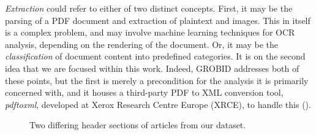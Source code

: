 \emph{Extraction} could refer to either of two distinct concepts. First, it may be the parsing of a PDF document and extraction of plaintext and images. This in itself is a complex problem, and may involve machine learning techniques for OCR analysis, depending on the rendering of the document. Or, it may be the  \emph{classification} of document content into predefined categories. It is on the second idea that we are focused within this work. Indeed, GROBID addresses both of these points, but the first is merely a precondition for the analysis it is primarily concerned with, and it houses a third-party PDF to XML conversion tool, \emph{pdftoxml}, developed at Xerox Research Centre Europe (XRCE), to handle this (\cite{dejean2006system}).

\begin{figure}[!ht]
\hfill
{}
\caption{Two differing header sections of articles from our dataset.}
\label{fig:headers}
\end{figure}

